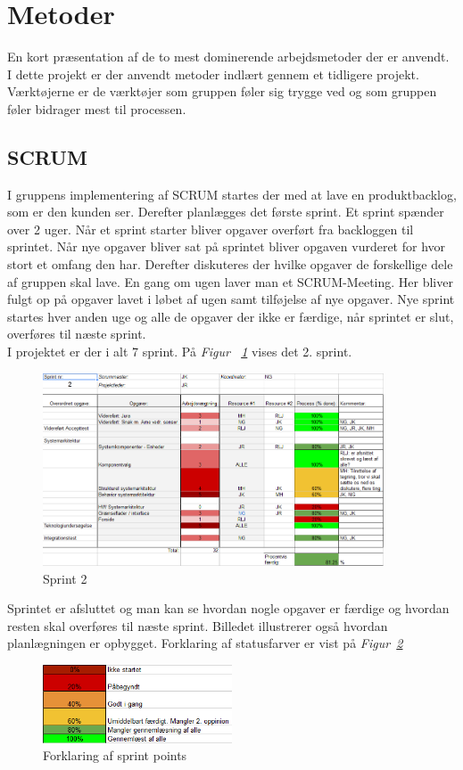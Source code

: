 \section{Metoder}
En kort præsentation af de to mest dominerende arbejdsmetoder der er anvendt.\\

I dette projekt er der anvendt metoder indlært gennem et tidligere projekt. Værktøjerne er de værktøjer som gruppen føler sig trygge ved og som gruppen føler bidrager mest til processen. 
\subsection{SCRUM}
I gruppens implementering af SCRUM startes der med at lave en produktbacklog, som er den kunden ser.  Derefter planlægges det første sprint. Et sprint spænder over 2 uger. Når et sprint starter bliver opgaver overført fra backloggen til sprintet. Når nye opgaver bliver sat på sprintet bliver opgaven vurderet for hvor stort et omfang den har. Derefter diskuteres der hvilke opgaver de forskellige dele af gruppen skal lave. En gang om ugen laver man et SCRUM-Meeting. Her bliver fulgt op på opgaver lavet i løbet af ugen samt tilføjelse af nye opgaver. Nye sprint startes hver anden uge og alle de opgaver der ikke er færdige, når sprintet er slut, overføres til næste sprint.\\
I projektet er der i alt 7 sprint. På \textit{Figur ~\ref{fig:SCRUM}} vises det 2. sprint.
\begin{figure}[H]
\centering
\includegraphics[width=0.9\textwidth]{billeder/SCRUM1}
\caption{Sprint 2}
\label{fig:SCRUM}
\end{figure}
Sprintet er afsluttet og man kan se hvordan nogle opgaver er færdige og hvordan resten skal overføres til næste sprint. Billedet illustrerer også hvordan planlægningen er opbygget. Forklaring af statusfarver er vist på \textit{Figur~\ref{fig:SCRUM2}}
\begin{figure}[H]
\centering
\includegraphics[width=0.5\textwidth]{billeder/SCRUM2}
\caption{Forklaring af sprint points}
\label{fig:SCRUM2}
\end{figure}
